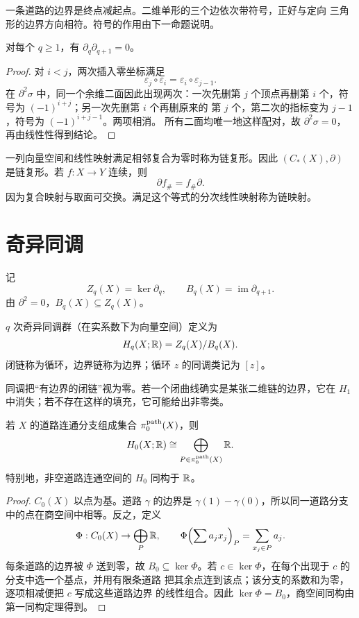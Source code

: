 一条道路的边界是终点减起点。二维单形的三个边依次带符号，正好与定向
三角形的边界方向相符。符号的作用由下一命题说明。

\begin{proposition}\label{prop:singular-boundary-square-zero}
对每个 $q\ge1$，有 $\partial_q\partial_{q+1}=0$。
\end{proposition}
\begin{proof}
对 $i<j$，两次插入零坐标满足
\[
 \varepsilon_j\circ\varepsilon_i
 =\varepsilon_i\circ\varepsilon_{j-1}.
\]
在 $\partial^2\sigma$ 中，同一个余维二面因此出现两次：一次先删第 $j$
个顶点再删第 $i$ 个，符号为 $(-1)^{i+j}$；另一次先删第 $i$ 个再删原来的
第 $j$ 个，第二次的指标变为 $j-1$，符号为 $(-1)^{i+j-1}$。两项相消。
所有二面均唯一地这样配对，故 $\partial^2\sigma=0$，再由线性性得到结论。
\end{proof}

一列向量空间和线性映射满足相邻复合为零时称为链复形。因此
$(C_*(X),\partial)$ 是链复形。若 $f:X\to Y$ 连续，则
\begin{equation}\label{eq:singular-chain-map}
 \partial f_\#=f_\#\partial.
\end{equation}
因为复合映射与取面可交换。满足这个等式的分次线性映射称为链映射。

\section{奇异同调}

记
\[
 Z_q(X)=\ker\partial_q,\qquad B_q(X)=\operatorname{im}\partial_{q+1}.
\]
由 $\partial^2=0$，$B_q(X)\subseteq Z_q(X)$。

\begin{definition}
$q$ 次奇异同调群（在实系数下为向量空间）定义为
\[
 H_q(X;\mathbb{R})=Z_q(X)/B_q(X).
\]
闭链称为循环，边界链称为边界；循环 $z$ 的同调类记为 $[z]$。
\end{definition}

同调把“有边界的闭链”视为零。若一个闭曲线确实是某张二维链的边界，它在
$H_1$ 中消失；若不存在这样的填充，它可能给出非零类。

\begin{proposition}\label{prop:h-zero-components}
若 $X$ 的道路连通分支组成集合 $\pi_0^{\rm path}(X)$，则
\[
 H_0(X;\mathbb{R})\cong
 \bigoplus_{P\in\pi_0^{\rm path}(X)}\mathbb{R}.
\]
特别地，非空道路连通空间的 $H_0$ 同构于 $\mathbb{R}$。
\end{proposition}
\begin{proof}
$C_0(X)$ 以点为基。道路 $\gamma$ 的边界是
$\gamma(1)-\gamma(0)$，所以同一道路分支中的点在商空间中相等。反之，定义
\[
 \Phi:C_0(X)\to\bigoplus_P\mathbb{R},\qquad
 \Phi\!\left(\sum a_jx_j\right)_P=\sum_{x_j\in P}a_j.
\]
每条道路的边界被 $\Phi$ 送到零，故 $B_0\subseteq\ker\Phi$。若
$c\in\ker\Phi$，在每个出现于 $c$ 的分支中选一个基点，并用有限条道路
把其余点连到该点；该分支的系数和为零，逐项相减便把 $c$ 写成这些道路边界
的线性组合。因此 $\ker\Phi=B_0$，商空间同构由第一同构定理得到。
\end{proof}

